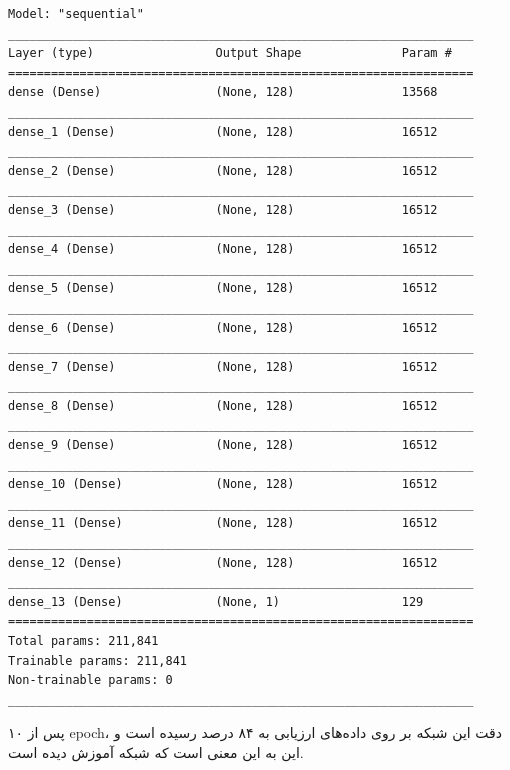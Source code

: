 \documentclass{article}
\begin{document}
\begin{latin}
\begin{lstlisting}
Model: "sequential"
_________________________________________________________________
Layer (type)                 Output Shape              Param #   
=================================================================
dense (Dense)                (None, 128)               13568     
_________________________________________________________________
dense_1 (Dense)              (None, 128)               16512     
_________________________________________________________________
dense_2 (Dense)              (None, 128)               16512     
_________________________________________________________________
dense_3 (Dense)              (None, 128)               16512     
_________________________________________________________________
dense_4 (Dense)              (None, 128)               16512     
_________________________________________________________________
dense_5 (Dense)              (None, 128)               16512     
_________________________________________________________________
dense_6 (Dense)              (None, 128)               16512     
_________________________________________________________________
dense_7 (Dense)              (None, 128)               16512     
_________________________________________________________________
dense_8 (Dense)              (None, 128)               16512     
_________________________________________________________________
dense_9 (Dense)              (None, 128)               16512     
_________________________________________________________________
dense_10 (Dense)             (None, 128)               16512     
_________________________________________________________________
dense_11 (Dense)             (None, 128)               16512     
_________________________________________________________________
dense_12 (Dense)             (None, 128)               16512     
_________________________________________________________________
dense_13 (Dense)             (None, 1)                 129       
=================================================================
Total params: 211,841
Trainable params: 211,841
Non-trainable params: 0
_________________________________________________________________
\end{lstlisting}
\end{latin}

پس از ۱۰ epoch، دقت این شبکه بر روی داده‌های ارزیابی به ۸۴ درصد رسیده است و این به این معنی است که شبکه آموزش دیده است.
\end{document}

